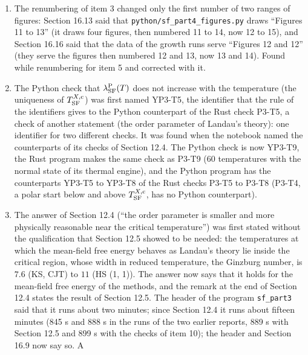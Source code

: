 \documentclass[
  10pt,
]{article}
\begin{document}
\begin{enumerate}
  cover a smaller interval than the curves of Section 12.1 and gave at
  \(T=0\) a residual different from that of Table 12.1; the curves now
  use the 61 applied fields of Section 12.1 (up to
  \(2\,\Phi^X_{0,{\rm SF}}(T)\)), and check P3-T7 confirms that the
  residual at \(T=0\) is that of Table 12.1.
\item
  The renumbering of item 3 changed only the first number of two ranges
  of figures: Section 16.13 said that
  \texttt{python/sf\_part4\_figures.py} draws ``Figures 11 to 13'' (it
  draws four figures, then numbered 11 to 14, now 12 to 15), and Section
  16.16 said that the data of the growth runs serve ``Figures 12 and
  12'' (they serve the figures then numbered 12 and 13, now 13 and 14).
  Found while renumbering for item 5 and corrected with it.
\item
  The Python check that \(\lambda^{\rm P}_{\rm SF}(T)\) does not
  increase with the temperature (the uniqueness of
  \(T^{X,{\rm c}}_{\rm SF}\)) was first named YP3-T5, the identifier
  that the rule of the identifiers gives to the Python counterpart of
  the Rust check P3-T5, a check of another statement (the order
  parameter of Landau's theory): one identifier for two different
  checks. It was found when the notebook named the counterparts of its
  checks of Section 12.4. The Python check is now YP3-T9, the Rust
  program makes the same check as P3-T9 (60 temperatures with the normal
  state of its thermal engine), and the Python program has the
  counterparts YP3-T5 to YP3-T8 of the Rust checks P3-T5 to P3-T8
  (P3-T4, a polar start below and above \(T^{X,{\rm c}}_{\rm SF}\), has
  no Python counterpart).
\item
  The answer of Section 12.4 (``the order parameter is smaller and more
  physically reasonable near the critical temperature'') was first
  stated without the qualification that Section 12.5 showed to be
  needed: the temperatures at which the mean-field free energy behaves
  as Landau's theory lie inside the critical region, whose width in
  reduced temperature, the Ginzburg number, is \(7.6\) (KS, CJT) to
  \(11\) (HS (1, 1)). The answer now says that it holds for the
  mean-field free energy of the methods, and the remark at the end of
  Section 12.4 states the result of Section 12.5. The header of the
  program \texttt{sf\_part3} said that it runs about two minutes; since
  Section 12.4 it runs about fifteen minutes (845 s and 888 s in the
  runs of the two earlier reports, 889 s with Section 12.5 and 899 s
  with the checks of item 10); the header and Section 16.9 now say so. A

\end{enumerate}
\end{document}
